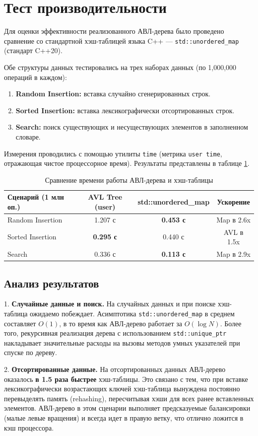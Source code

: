 \section{Тест производительности}

Для оценки эффективности реализованного АВЛ-дерева было проведено сравнение со стандартной хэш-таблицей языка C++ --- \texttt{std::unordered\_map} (стандарт C++20). 

Обе структуры данных тестировались на трех наборах данных (по 1,000,000 операций в каждом):
\begin{enumerate}
    \item \textbf{Random Insertion:} вставка случайно сгенерированных строк.
    \item \textbf{Sorted Insertion:} вставка лексикографически отсортированных строк.
    \item \textbf{Search:} поиск существующих и несуществующих элементов в заполненном словаре.
\end{enumerate}

Измерения проводились с помощью утилиты \texttt{time} (метрика \texttt{user time}, отражающая чистое процессорное время). Результаты представлены в таблице \ref{tab:bench_results}.

\begin{table}[h!]
\centering
\begin{tabular}{|l|c|c|c|}
\hline
\textbf{Сценарий (1 млн оп.)} & \textbf{AVL Tree (user)} & \textbf{std::unordered\_map} & \textbf{Ускорение} \\ \hline
Random Insertion & 1.207 с & \textbf{0.453 с} & Map в 2.6x \\ \hline
Sorted Insertion & \textbf{0.295 с} & 0.440 с & AVL в 1.5x \\ \hline
Search           & 0.336 с & \textbf{0.113 с} & Map в 2.9x \\ \hline
\end{tabular}
\caption{Сравнение времени работы АВЛ-дерева и хэш-таблицы}
\label{tab:bench_results}
\end{table}

\subsection*{Анализ результатов}

1. \textbf{Случайные данные и поиск.} На случайных данных и при поиске хэш-таблица ожидаемо побеждает. Асимптотика \texttt{std::unordered\_map} в среднем составляет $O(1)$, в то время как АВЛ-дерево работает за $O(\log N)$. Более того, рекурсивная реализация дерева с использованием \texttt{std::unique\_ptr} накладывает значительные расходы на вызовы методов умных указателей при спуске по дереву.

2. \textbf{Отсортированные данные.} На отсортированных данных АВЛ-дерево оказалось \textbf{в 1.5 раза быстрее} хэш-таблицы. Это связано с тем, что при вставке лексикографически возрастающих ключей хэш-таблица вынуждена постоянно перевыделять память (rehashing), пересчитывая хэши для всех ранее вставленных элементов. АВЛ-дерево в этом сценарии выполняет предсказуемые балансировки (малые левые вращения) и всегда идет в правую ветку, что отлично ложится в кэш процессора.

\pagebreak